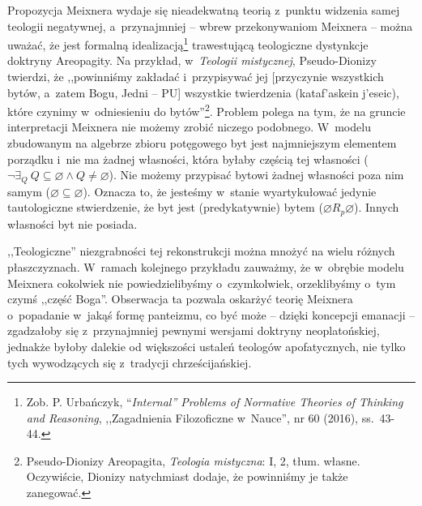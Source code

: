Propozycja Meixnera wydaje się nieadekwatną teorią z~punktu widzenia samej teologii negatywnej, a~przynajmniej -- wbrew przekonywaniom Meixnera -- można uważać, że jest formalną idealizacją\footnote{Zob. P. Urbańczyk, ``\textit{Internal'' Problems of Normative Theories of Thinking and Reasoning}, ,,Zagadnienia Filozoficzne w~Nauce'', nr 60 (2016), ss.~43-44.} trawestującą teologiczne dystynkcje doktryny Areopagity. Na przykład, w~\textit{Teologii mistycznej}, Pseudo-Dionizy twierdzi, że ,,powinniśmy zakładać i~przypisywać jej [przyczynie wszystkich bytów, a~zatem Bogu, Jedni -- PU] wszystkie twierdzenia (\textgreek{kataf'askein j'eseic}), które czynimy w~odniesieniu do bytów''\footnote{Pseudo-Dionizy Areopagita, \textit{Teologia mistyczna}: I, 2, tłum. własne. Oczywiście, Dionizy natychmiast dodaje, że powinniśmy je także zanegować.}. Problem polega na tym, że na gruncie interpretacji Meixnera nie możemy zrobić niczego podobnego. W~modelu zbudowanym na algebrze zbioru potęgowego byt jest najmniejszym elementem porządku i~nie ma żadnej własności, która byłaby częścią tej własności ($\neg \exists_Q\ Q \subseteq \varnothing \land Q \neq \varnothing$). Nie możemy przypisać bytowi żadnej własności poza nim samym ($\varnothing \subseteq \varnothing$). Oznacza to, że jesteśmy w~stanie wyartykułować jedynie tautologiczne stwierdzenie, że byt jest (predykatywnie) bytem ($\varnothing R_p \varnothing$). Innych własności byt nie posiada.

,,Teologiczne'' niezgrabności tej rekonstrukcji można mnożyć na wielu różnych płaszczyznach. W~ramach kolejnego przykładu zauważmy, że w~obrębie modelu Meixnera cokolwiek nie powiedzielibyśmy o~czymkolwiek, orzeklibyśmy o~tym czymś ,,część Boga''. Obserwacja ta pozwala oskarżyć teorię Meixnera o~popadanie w~jakąś formę panteizmu, co być może -- dzięki koncepcji emanacji -- zgadzałoby się z~przynajmniej pewnymi wersjami doktryny neoplatońskiej, jednakże byłoby dalekie od większości ustaleń teologów apofatycznych, nie tylko tych wywodzących się z~tradycji chrześcijańskiej.

